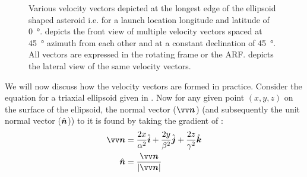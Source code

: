 \begin{figure}[htb]
\caption{Various velocity vectors depicted at the longest edge of the ellipsoid shaped asteroid i.e. for a launch location longitude and latitude of \SI{0}{\degree}. \protect{} depicts the front view of multiple velocity vectors spaced at \SI{45}{\degree} azimuth from each other and at a constant declination of \SI{45}{\degree}. All vectors are expressed in the rotating frame or the \gls{ARF}. \protect{} depicts the lateral view of the same velocity vectors.}
\label{fig:longest_edge_velocity_vector_cone}
\end{figure}
\FloatBarrier
We will now discuss how the velocity vectors are formed in practice. Consider the equation for a triaxial ellipsoid given in . Now for any given point $(x,y,z)$ on the surface of the ellipsoid, the normal vector ($\bv{n}$) (and subsequently the unit normal vector ($\hat{\bm{n}}$)) to it is found by taking the gradient of :
\begin{align}
    \bv{n} &= \frac{2x}{\alpha^2}\buvec{i} + \frac{2y}{\beta^2}\buvec{j} + \frac{2z}{\gamma^2}\buvec{k}
    \label{eqn:surface_normal_vector} \\
    \buvec{n} &= \frac{\bv{n}}{|\bv{n}|}
    \label{eqn:unit_normal}
\end{align}
